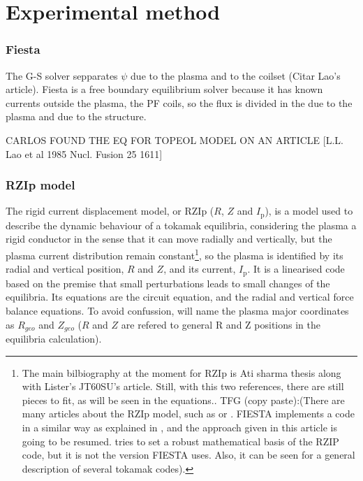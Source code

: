 \documentclass[a4paper,12pt,oneside]{book}
\begin{document}
\chapter{Experimental method}

\subsection{Fiesta}

The G-S solver sepparates $\psi$ due to the plasma and to the coilset (Citar Lao's article). Fiesta is a free boundary equilibrium solver because it has known currents outside the plasma, the PF coils, so the flux is divided in the due to the plasma and due to the structure.

CARLOS FOUND THE EQ FOR TOPEOL MODEL ON AN ARTICLE [L.L. Lao et al 1985 Nucl. Fusion 25 1611]

\subsection{RZIp model}
\label{RZIP, teoria}


The rigid current displacement model, or RZIp ($R$, $Z$ and $I_\text{p}$), is a model used to describe the dynamic behaviour of a tokamak equilibria, considering the plasma a rigid conductor in the sense that it can move radially and vertically, but the plasma current distribution remain constant\footnote{ The main bilbiography at the moment for RZIp is Ati sharma thesis along with Lister's JT60SU's article. Still, with this two references, there are still pieces to fit, as will be seen in the equations..     TFG (copy paste):(There are many articles about the RZIp model, such as \cite{RZIP} or \cite{RZIpFiesta}. FIESTA implements a code in a similar way as explained in \cite{RZIpFiesta}, and the approach given in this article is going to be resumed. \cite{RZIP} tries to set a robust mathematical basis of the RZIP code, but it is not the version FIESTA uses. Also, it can be seen \cite{Sevillano} for a general description of several tokamak codes).}, so the plasma is identified by its radial and vertical position, $R$ and $Z$, and its current, $I_\text{p}$. It is a linearised code based on the premise that small perturbations leads to small changes of the equilibria. Its equations are the circuit equation, and the radial and vertical force balance equations.  To avoid confussion, will name the plasma major coordinates as $R_{geo}$ and $Z_{geo}$ ($R$ and $Z$ are refered to general R and Z positions in the equilibria calculation).
\end{document}
